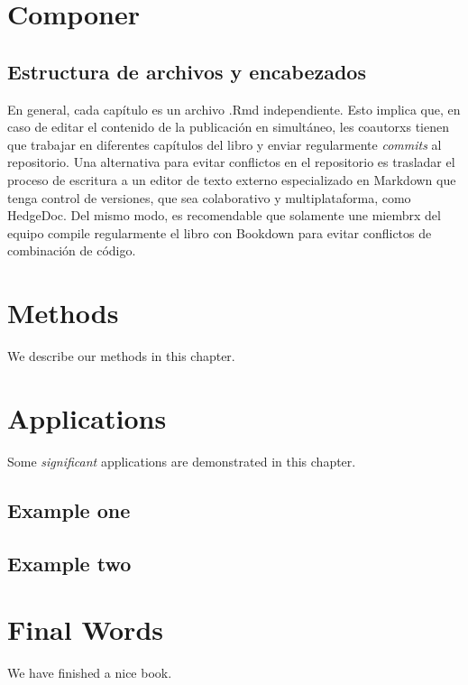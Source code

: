 \documentclass[
]{book}
\begin{document}
\hypertarget{componer}{%
\chapter{Componer}\label{componer}}

\hypertarget{estructura-de-archivos-y-encabezados}{%
\section{Estructura de archivos y encabezados}\label{estructura-de-archivos-y-encabezados}}

En general, cada capítulo es un archivo .Rmd independiente. Esto implica que, en caso de editar el contenido de la publicación en simultáneo, les coautorxs tienen que trabajar en diferentes capítulos del libro y enviar regularmente \emph{commits} al repositorio. Una alternativa para evitar conflictos en el repositorio es trasladar el proceso de escritura a un editor de texto externo especializado en Markdown que tenga control de versiones, que sea colaborativo y multiplataforma, como HedgeDoc. Del mismo modo, es recomendable que solamente une miembrx del equipo compile regularmente el libro con Bookdown para evitar conflictos de combinación de código.

\hypertarget{methods}{%
\chapter{Methods}\label{methods}}

We describe our methods in this chapter.

\hypertarget{applications}{%
\chapter{Applications}\label{applications}}

Some \emph{significant} applications are demonstrated in this chapter.

\hypertarget{example-one}{%
\section{Example one}\label{example-one}}

\hypertarget{example-two}{%
\section{Example two}\label{example-two}}

\hypertarget{final-words}{%
\chapter{Final Words}\label{final-words}}

We have finished a nice book.

  
\end{document}
